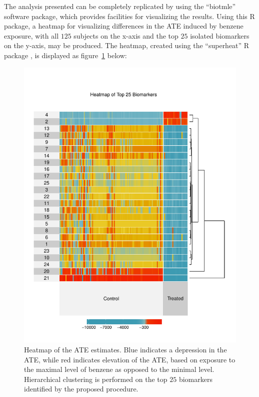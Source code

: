 The analysis presented can be completely replicated by using the ``biotmle''
software package, which provides facilities for visualizing the results. Using
this R package, a heatmap for visualizing differences in the ATE induced by
benzene exposure, with all $125$ subjects on the x-axis and the top $25$
isolated biomarkers on the y-axis, may be produced. The heatmap, created using
the ``superheat'' R package \cite{barter2017superheat}, is displayed as
figure~\ref{fig:heatmap} below:

\begin{figure}[H]
  \vspace{-4em}
  \label{fig:heatmap}
  \centering
  \includegraphics[scale=0.75]{figs/superheatmap.pdf}
  \caption{Heatmap of the ATE estimates. Blue indicates a depression in the
    ATE, while red indicates elevation of the ATE, based on exposure to the
    maximal level of benzene as opposed to the minimal level. Hierarchical
    clustering is performed on the top $25$ biomarkers identified by the
    proposed procedure.}
\end{figure}


